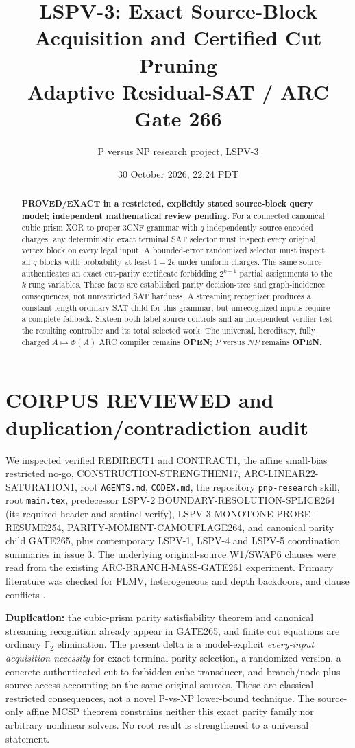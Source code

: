 \documentclass[11pt]{article}
\title{LSPV-3: Exact Source-Block Acquisition and Certified Cut Pruning\\\large Adaptive Residual-SAT / ARC Gate 266}
\author{P versus NP research project, LSPV-3}
\date{30 October 2026, 22:24 PDT}
\begin{document}
\maketitle
\begin{abstract}
\textbf{PROVED/EXACT in a restricted, explicitly stated source-block query model; independent mathematical review pending.} For a connected canonical cubic-prism XOR-to-proper-3CNF grammar with $q$ independently source-encoded charges, any deterministic exact terminal SAT selector must inspect every original vertex block on every legal input. A bounded-error randomized selector must inspect all $q$ blocks with probability at least $1-2\epsilon$ under uniform charges. The same source authenticates an exact cut-parity certificate forbidding $2^{k-1}$ partial assignments to the $k$ rung variables. These facts are established parity decision-tree and graph-incidence consequences, not unrestricted SAT hardness. A streaming recognizer produces a constant-length ordinary SAT child for this grammar, but unrecognized inputs require a complete fallback. Sixteen both-label source controls and an independent verifier test the resulting controller and its total selected work. The universal, hereditary, fully charged $A\mapsto\Phi(A)$ ARC compiler remains \textbf{OPEN}; $P$ versus $NP$ remains \textbf{OPEN}.
\end{abstract}
\section{CORPUS REVIEWED and duplication/contradiction audit}
We inspected verified REDIRECT1 and CONTRACT1, the affine small-bias restricted no-go, CONSTRUCTION-STRENGTHEN17, ARC-LINEAR22-SATURATION1, root \texttt{AGENTS.md}, \texttt{CODEX.md}, the repository \texttt{pnp-research} skill, root \texttt{main.tex}, predecessor LSPV-2 BOUNDARY-RESOLUTION-SPLICE264 (its required header and sentinel verify), LSPV-3 MONOTONE-PROBE-RESUME254, PARITY-MOMENT-CAMOUFLAGE264, and canonical parity child GATE265, plus contemporary LSPV-1, LSPV-4 and LSPV-5 coordination summaries in issue 3. The underlying original-source W1/SWAP6 clauses were read from the existing ARC-BRANCH-MASS-GATE261 experiment. Primary literature was checked for FLMV, heterogeneous and depth backdoors, and clause conflicts \cite{FLMV,DOS,Gaspers,Kullmann}.

\textbf{Duplication:} the cubic-prism parity satisfiability theorem and canonical streaming recognition already appear in GATE265, and finite cut equations are ordinary $\mathbb F_2$ elimination. The present delta is a model-explicit \emph{every-input acquisition necessity} for exact terminal parity selection, a randomized version, a concrete authenticated cut-to-forbidden-cube transducer, and branch/node plus source-access accounting on the same original sources. These are classical restricted consequences, not a novel P-vs-NP lower-bound technique. The source-only affine MCSP theorem constrains neither this exact parity family nor arbitrary nonlinear solvers. No root result is strengthened to a universal statement.
\end{document}
